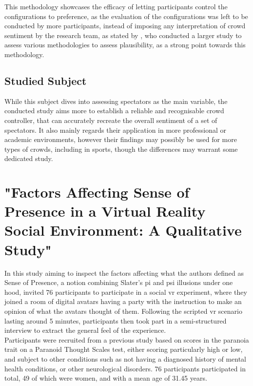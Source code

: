 This methodology showcases the efficacy of letting participants control the configurations to preference, as the evaluation of the configurations was left to be conducted by more participants, instead of imposing any interpretation of crowd sentiment by the research team, as stated by \cite{murcia-2020-evaluating}, who conducted a larger study to assess various methodologies to assess plausibility, as a strong point towards this methodology.

\subsection{Studied Subject}

While this subject dives into assessing spectators as the main variable, the conducted study aims more to establish a reliable and recognisable crowd controller, that can accurately recreate the overall sentiment of a set of spectators. It also mainly regards their application in more professional or academic environments, however their findings may possibly be used for more types of crowds, including in sports, though the differences may warrant some dedicated study.

\section{"Factors Affecting Sense of Presence in a Virtual Reality Social Environment: A Qualitative Study"}

In this study aiming to inspect the factors affecting what the authors defined as Sense of Presence, a notion combining Slater's \gls{pi} and \gls{psi} illusions under one hood, \cite{riches-2019-factors} invited 76 participants to participate in a social \gls{vr} experiment, where they joined a room of digital avatars having a party with the instruction to make an opinion of what the avatars thought of them. Following the scripted \gls{vr} scenario lasting around 5 minutes, participants then took part in a semi-structured interview to extract the general feel of the experience.\\

Participants were recruited from a previous study based on scores in the paranoia trait on a Paranoid Thought Scales test, either scoring particularly high or low, and subject to other conditions such as not having a diagnosed history of mental health conditions, or other neurological disorders. 76 participants participated in total, 49 of which were women, and with a mean age of 31.45 years.\\

